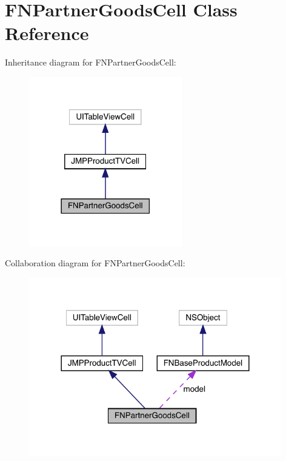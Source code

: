 \hypertarget{interface_f_n_partner_goods_cell}{}\section{F\+N\+Partner\+Goods\+Cell Class Reference}
\label{interface_f_n_partner_goods_cell}


Inheritance diagram for F\+N\+Partner\+Goods\+Cell\+:\nopagebreak
\begin{figure}[H]
\begin{center}
\leavevmode
\includegraphics[width=189pt]{interface_f_n_partner_goods_cell__inherit__graph}
\end{center}
\end{figure}


Collaboration diagram for F\+N\+Partner\+Goods\+Cell\+:\nopagebreak
\begin{figure}[H]
\begin{center}
\leavevmode
\includegraphics[width=312pt]{interface_f_n_partner_goods_cell__coll__graph}
\end{center}
\end{figure}
